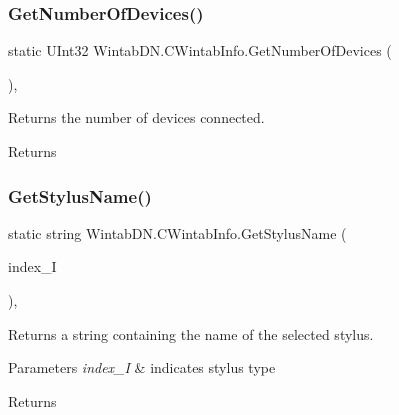 \subsubsection{\texorpdfstring{Get\+Number\+Of\+Devices()}{GetNumberOfDevices()}}
{\footnotesize\ttfamily static U\+Int32 Wintab\+D\+N.\+C\+Wintab\+Info.\+Get\+Number\+Of\+Devices (\begin{DoxyParamCaption}{ }\end{DoxyParamCaption})\hspace{0.3cm}{\ttfamily [inline]}, {\ttfamily [static]}}



Returns the number of devices connected. 

\begin{DoxyReturn}{Returns}

\end{DoxyReturn}
\mbox{\label{class_wintab_d_n_1_1_c_wintab_info_a6ad2f1350b2b5b447dd428f509892d14}} 
\subsubsection{\texorpdfstring{Get\+Stylus\+Name()}{GetStylusName()}}
{\footnotesize\ttfamily static string Wintab\+D\+N.\+C\+Wintab\+Info.\+Get\+Stylus\+Name (\begin{DoxyParamCaption}\item[{\mbox{\hyperlink{namespace_wintab_d_n_a54fdc0e52106effb073b35f8f6b3920a}{E\+W\+T\+I\+Cursor\+Name\+Index}}}]{index\+\_\+I }\end{DoxyParamCaption})\hspace{0.3cm}{\ttfamily [inline]}, {\ttfamily [static]}}



Returns a string containing the name of the selected stylus. 


\begin{DoxyParams}{Parameters}
{\em index\+\_\+I} & indicates stylus type\\
\hline
\end{DoxyParams}
\begin{DoxyReturn}{Returns}

\end{DoxyReturn}
\mbox{\label{class_wintab_d_n_1_1_c_wintab_info_a2ec0c06074db048531e4de218c5e3755}} 
